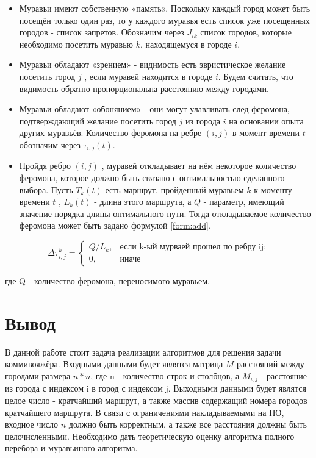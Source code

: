 \begin{itemize}
	\item Муравьи имеют собственную «память».
	      Поскольку каждый город может быть посещён только один раз, то у каждого муравья есть список уже посещенных городов - список запретов.
	      Обозначим через $J_{ik}$ список городов, которые необходимо посетить муравью $k$, находящемуся в городе $i$.
	\item Муравьи обладают «зрением» - видимость есть эвристическое желание посетить город $j$ , если муравей находится в городе $i$.
	      Будем считать, что видимость обратно пропорциональна расстоянию между городами.
	\item Муравьи обладают «обонянием» - они могут улавливать след феромона, подтверждающий желание посетить город $j$ из города $i$ на основании опыта других муравьёв.
	      Количество феромона на ребре $(i,j)$ в момент времени $t$ обозначим через  $\tau_{i,j} (t)$.
	\item Пройдя ребро $(i,j)$ , муравей откладывает на нём некоторое количество феромона, которое должно быть связано с оптимальностью сделанного выбора.
	      Пусть $T _{k} (t)$ есть маршрут, пройденный муравьем $k$ к моменту времени $t$ , $L _{k} (t)$ - длина этого маршрута, а $Q$ - параметр,
	      имеющий значение порядка длины оптимального пути. Тогда откладываемое количество феромона может быть задано формулой \ref{form:add}.

\end{itemize}



\begin{equation}\label{form:add}
	{\displaystyle \Delta \tau_{i,j}^k={\begin{cases}Q/L_{k}, & {\mbox{если k-ый мурваей прошел по ребру ij;}}\\0,&{\mbox{иначе}}\end{cases}}}
\end{equation}

где Q - количество феромона, переносимого муравьем.
\section*{Вывод} 
В данной работе стоит задача реализации алгоритмов для решения задачи коммивояжёра. Входными данными будет являтся матрица $M$ расстояний между городами размера  $n * n$, где n - количество строк и столбцов, а $M_{i,j}$ - расстояние из города с индексом i в город с индексом j. Выходными данными будет являтся целое число - кратчайший маршрут, а также массив содержащий номера городов кратчайшего маршрута. В связи с ограничениями накладываемыми на ПО, входное число $n$ должно быть корректным, а также все расстояния должны быть целочисленными. Необходимо дать теоретическую оценку алгоритма полного перебора и муравьиного алгоритма.
